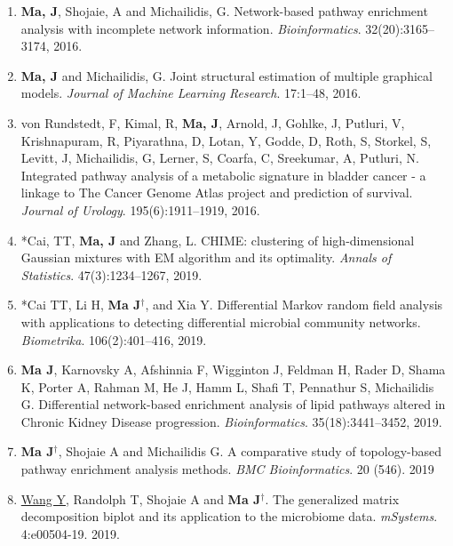\documentclass[10pt]{article}
\begin{document}
\begin{enumerate}
\item \textbf{Ma, J}, Shojaie, A and Michailidis, G. Network-based pathway enrichment analysis with incomplete network information. {\em Bioinformatics}. 32(20):3165--3174, 2016.
\item \textbf{Ma, J} and Michailidis, G. Joint structural estimation of multiple graphical models. {\em Journal of Machine Learning Research}. 17:1--48, 2016.
\item von Rundstedt, F, Kimal, R, \textbf{Ma, J}, Arnold, J, Gohlke, J, Putluri, V, Krishnapuram, R, Piyarathna, D, Lotan, Y, Godde, D, Roth, S, Storkel, S, Levitt, J, Michailidis, G, Lerner, S, Coarfa, C, Sreekumar, A, Putluri, N. Integrated pathway analysis of a metabolic signature in bladder cancer - a linkage to The Cancer Genome Atlas project and prediction of survival. {\em Journal of Urology}. 195(6):1911--1919, 2016.
\item *Cai, TT, \textbf{Ma, J} and Zhang, L. CHIME: clustering of high-dimensional Gaussian mixtures with EM algorithm and its optimality. {\em Annals of Statistics}. 47(3):1234--1267, 2019. 
 \item *Cai TT, Li H, \textbf{Ma J}$^{\dagger}$, and Xia Y. Differential Markov random field analysis with applications to detecting differential microbial community networks. {\em Biometrika}. 106(2):401--416, 2019. 
 \item \textbf{Ma J}, Karnovsky A, Afshinnia F, Wigginton J, Feldman H, Rader D, Shama K, Porter A, Rahman M, He J, Hamm L, Shafi T, Pennathur S, Michailidis G. Differential network-based enrichment analysis of lipid pathways altered in Chronic Kidney Disease progression. {\em Bioinformatics}. 35(18):3441--3452, 2019.
 \item \textbf{Ma J}{$^{\dagger}$}, Shojaie A and Michailidis G. A comparative study of topology-based pathway enrichment analysis methods. {\em BMC Bioinformatics}. 20 (546). 2019 
 \item \underline{Wang Y}, Randolph T, Shojaie A and \textbf{Ma J}{$^{\dagger}$}. The generalized matrix decomposition biplot and its application to the microbiome data. {\em mSystems}. 4:e00504-19. 2019.

\end{enumerate}
\end{document}
